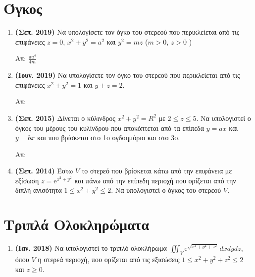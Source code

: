 


\pagestyle{askhseis}

\renewcommand{\vec}{\mathbf}



\begin{center}
  \minibox{\large \bfseries \textcolor{Col1}{θέματα στo Τριπλό Ολοκλήρωμα}}
\end{center}

\vspace{\baselineskip}

\section*{Όγκος}

\begin{enumerate}
  \item \textbf{(Σεπ. 2019)} Να υπολογίσετε τον όγκο του στερεού που περικλείεται 
    από τις επιφάνειες $ z=0 $, $ x^{2}+y^{2}=a^{2} $ και $ y^{2}=mz $ ($ m>0$, $ z>0 $ )

    \hfill Απ: $ \frac{\pi a^{4}}{4m} $

  \item \textbf{(Ιουν. 2019)} Να υπολογίσετε τον όγκο του στερεού που περικλείεται 
    από τις επιφάνειες $ x^{2}+y^{2}=1 $ και $ y+z=2 $.

    \hfill Απ:  

  \item \textbf{(Σεπ. 2015)} Δίνεται ο κύλινδρος $ x^{2}+y^{2}=R^{2} $ με $ 2 \leq z \leq
    5 $. Να υπολογιστεί ο όγκος του μέρους του κυλίνδρου που αποκόπτεται από τα επίπεδα 
    $ y=ax $ και $ y=bx $ και που βρίσκεται στο 1ο ογδοημόριο και στο 3ο.

    \hfill Απ:  

  \item \textbf{(Σεπ. 2014)} Έστω $V$ το στερεό που βρίσκεται κάτω από την επιφάνεια 
    με εξίσωση $ z = \mathrm{e}^{x^{2}+y^{2}} $ και πάνω από την επίπεδη περιοχή που 
    ορίζεται από την διπλή ανισότητα $ 1 \leq x^{2}+y^{2} \leq 2 $. Να υπολογιστεί 
    ο όγκος του στερεού $V$.
\end{enumerate}


\section*{Τριπλά Ολοκληρώματα}

\begin{enumerate}
  \item \textbf{(Ιαν. 2018)} Να υπολογιστεί το τριπλό ολοκλήρωμα $ \iiint_{V}
    \mathrm{e}^{\sqrt{x^{2}+y^{2}+z^{2}}} \, dxdydz $, όπου $ V $ η στερεά περιοχή, 
    που ορίζεται από τις εξισώσεις $ 1 \leq x^{2}+y^{2}+z^{2} \leq 2 $ και $ z \geq 0 $.

\end{enumerate}


